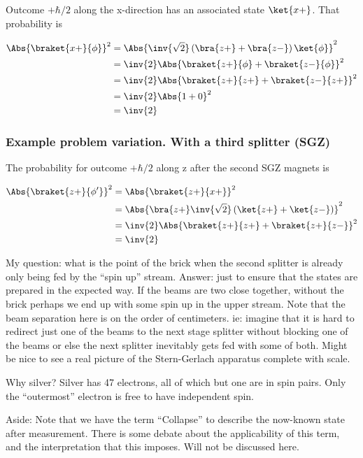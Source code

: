 Outcome $+\hbar/2$ along the x-direction has an associated state $\ket{x+}$.  That probability is

\begin{align*}
\Abs{\braket{x+}{\phi}}^2
&=
\Abs{
\inv{\sqrt{2}} \left( \bra{z+} + \bra{z-} \right) \ket{\phi}
}^2 \\
&=
\inv{2}
\Abs{
\braket{z+}{\phi} + \braket{z-}{\phi}
}^2 \\
&=
\inv{2}
\Abs{
\braket{z+}{z+} + \braket{z-}{z+}
}^2 \\
&=
\inv{2}
\Abs{
1 + 0
}^2 \\
&=
\inv{2}
\end{align*}

\subsubsection{Example problem variation.  With a third splitter (SGZ)}

The probability for outcome $+\hbar/2$ along z after the second SGZ magnets is

\begin{align*}
\Abs{\braket{z+}{\phi'}}^2
&=
\Abs{\braket{z+}{x+}}^2 \\
&=
\Abs{\bra{z+} \inv{\sqrt{2}} \left( \ket{z+} + \ket{z-} \right) }^2 \\
&=
\inv{2}
\Abs{\braket{z+}{z+} + \braket{z+}{z-} }^2 \\
&=
\inv{2}
\end{align*}

My question: what is the point of the brick when the second splitter is already only being fed by the ``spin up'' stream.  Answer: just to ensure that the states are prepared in the expected way.  If the beams are two close together, without the brick perhaps we end up with some spin up in the upper stream.  Note that the beam separation here is on the order of centimeters.  ie: imagine that it is hard to redirect just one of the beams to the next stage splitter without blocking one of the beams or else the next splitter inevitably gets fed with some of both.  Might be nice to see a real picture of the Stern-Gerlach apparatus complete with scale.

Why silver?  Silver has 47 electrons, all of which but one are in spin pairs.  Only the ``outermost'' electron is free to have independent spin.

Aside: Note that we have the term ``Collapse'' to describe the now-known state after measurement.  There is some debate about the applicability of this term, and the interpretation that this imposes.  Will not be discussed here.


